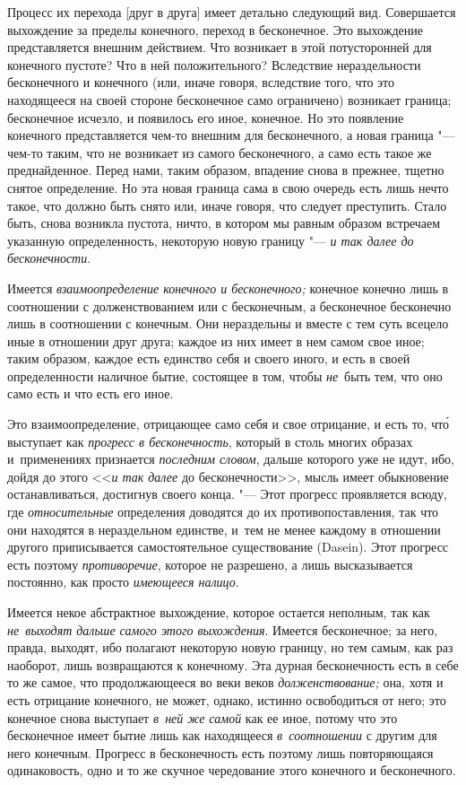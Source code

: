 Процесс их перехода [друг в друга] имеет детально следующий вид. Совершается
выхождение за пределы конечного, переход в бесконечное. Это выхождение
представляется внешним действием. Что возникает в этой потусторонней для
конечного пустоте? Что в ней положительного? Вследствие нераздельности
бесконечного и конечного (или, иначе говоря, вследствие того, что это
находящееся на своей стороне бесконечное само ограничено) возникает
граница; бесконечное исчезло, и появилось его иное, конечное. Но это
появление конечного представляется чем-то внешним для бесконечного, а
новая граница "--- чем-то таким, что не возникает из самого бесконечного, а
само есть такое же преднайденное. Перед нами, таким образом, впадение снова
в прежнее, тщетно снятое определение. Но эта новая граница сама в свою
очередь есть лишь нечто такое, что должно быть снято или, иначе говоря, что
следует преступить. Стало быть, снова возникла пустота, ничто, в котором мы
равным образом встречаем указанную определенность, некоторую новую границу
"--- {\em и так далее до бесконечности}.

Имеется {\em взаимоопределение конечного и бесконечного;} конечное конечно лишь
в соотношении с долженствованием или с бесконечным, а бесконечное бесконечно
лишь в соотношении с конечным. Они нераздельны и вместе с тем суть всецело иные
в отношении друг друга; каждое из них имеет в нем самом свое иное; таким
образом, каждое есть единство себя и своего иного, и есть в своей
определенности наличное бытие, состоящее в том, чтобы {\em не}~быть тем, что
оно само есть и что есть его иное.

Это взаимоопределение, отрицающее само себя и свое отрицание, и есть то, чт\'{о}
выступает как {\em прогресс в бесконечность}, который в столь многих образах
и~применениях признается {\em последним словом}, дальше которого уже не идут,
ибо, дойдя до этого <<{\em и так далее} до бесконечности>>, мысль имеет
обыкновение останавливаться, достигнув своего конца. "--- Этот прогресс
проявляется всюду, где {\em относительные} определения доводятся до их
противопоставления, так что они находятся в нераздельном единстве, и~тем не
менее каждому в отношении другого приписывается самостоятельное существование
(Dasein). Этот прогресс есть поэтому {\em противоречие}, которое не разрешено,
а лишь высказывается постоянно, как просто {\em имеющееся налицо}.

Имеется некое абстрактное выхождение, которое остается неполным, так как
{\em не~выходят дальше самого этого выхождения}. Имеется бесконечное; за него,
правда, выходят, ибо полагают некоторую новую границу, но тем самым, как раз
наоборот, лишь возвращаются к конечному. Эта дурная бесконечность есть в себе
то же самое, что продолжающееся во веки веков {\em долженствование;} она, хотя
и есть отрицание конечного, не может, однако, истинно освободиться от него; это
конечное снова выступает {\em в~ней же самой} как ее иное, потому что это
бесконечное имеет бытие лишь как находящееся {\em в~соотношении} с другим для
него конечным. Прогресс в бесконечность есть поэтому лишь повторяющаяся
одинаковость, одно и то же скучное чередование этого конечного и бесконечного.

